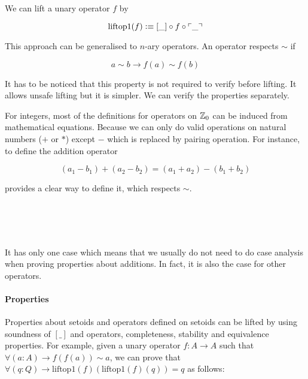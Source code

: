 We can lift a unary operator $f$ by 

$$\text{liftop1}(f) \vcentcolon\equiv [\_] \circ f \circ \ulcorner\_\urcorner$$

This approach can be generalised to $n$-ary operators. An operator respects $\sim$ if


$$a \sim b \to f(a) \sim f(b)$$


It has to be noticed that this property is not required to verify before lifting.
It allows unsafe lifting but it is simpler. We can verify the properties separately. 


For integers, most of the definitions for operators on $\mathbb{Z}_0$ can be induced from mathematical equations. Because we can only do valid operations on natural numbers ($+$ or $*$) except $-$ which is replaced by pairing operation. For instance, to define the addition operator

$$(a_1 - b_1) + (a_2 - b_2) = (a_1 + a_2) - (b_1 + b_2)$$

provides a clear way to define it, which respects $\sim$.

\begin{code}
\\
\>\AgdaFunction{\_+\_} \AgdaSymbol{:}     \<%
\\
\>\AgdaSymbol{(} \AgdaInductiveConstructor{,} \AgdaSymbol{)} \AgdaFunction{+} \AgdaSymbol{(} \AgdaInductiveConstructor{,} \AgdaSymbol{)} \AgdaSymbol{=} \AgdaSymbol{(}  \AgdaSymbol{)} \AgdaInductiveConstructor{,} \AgdaSymbol{(}  \AgdaSymbol{)}\<%
\\
\end{code}

It has only one case which means that we usually do not need to do case analysis when proving properties about additions. In fact, it is also the case for other operators.



\paragraph{Properties}

Properties about setoids and operators defined on setoids can be lifted by using soundness of $[\_]$ and operators, completeness, stability and equivalence properties. For example, given a unary operator $f : A \to A$ such that $\forall (a : A) \to f (f (a)) \sim a$, we can prove that $\forall(q : Q) \to \text{liftop1}(f)(\text{liftop1}(f)(q)) = q$ as follows:

